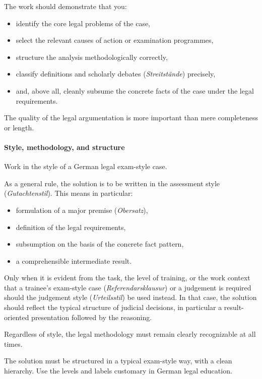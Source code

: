 \documentclass[11pt]{article}
\providecommand{\tightlist}{%
  \setlength{\itemsep}{0pt}\setlength{\parskip}{0pt}}
\begin{document}
The work should demonstrate that you:

\begin{itemize}
\tightlist
\item
  identify the core legal problems of the case,
\item
  select the relevant causes of action or examination programmes,
\item
  structure the analysis methodologically correctly,
\item
  classify definitions and scholarly debates (\emph{Streitstände})
  precisely,
\item
  and, above all, cleanly subsume the concrete facts of the case under
  the legal requirements.
\end{itemize}

The quality of the legal argumentation is more important than mere
completeness or length.

\paragraph{Style, methodology, and
structure}\label{style-methodology-and-structure}

Work in the style of a German legal exam-style case.

As a general rule, the solution is to be written in the assessment style
(\emph{Gutachtenstil}). This means in particular:

\begin{itemize}
\tightlist
\item
  formulation of a major premise (\emph{Obersatz}),
\item
  definition of the legal requirements,
\item
  subsumption on the basis of the concrete fact pattern,
\item
  a comprehensible intermediate result.
\end{itemize}

Only when it is evident from the task, the level of training, or the
work context that a trainee's exam-style case
(\emph{Referendarsklausur}) or a judgement is required should the
judgement style (\emph{Urteilsstil}) be used instead. In that case, the
solution should reflect the typical structure of judicial decisions, in
particular a result-oriented presentation followed by the reasoning.

Regardless of style, the legal methodology must remain clearly
recognizable at all times.

The solution must be structured in a typical exam-style way, with a
clean hierarchy. Use the levels and labels customary in German legal
education.
\end{document}
